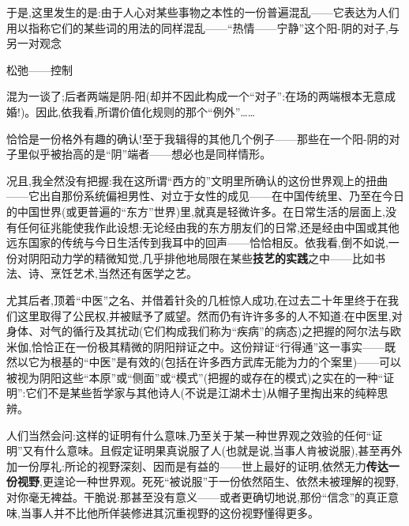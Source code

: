 于是,这里发生的是:由于人心对某些事物之本性的一份普遍混乱——它表达为人们用以指称它们的某些词的用法的同样混乱——“热情——宁静”这个阳-阴的对子,与另一对观念

\begin{center}松弛——控制\end{center}

混为一谈了;后者两端是阴-阳(却并不因此构成一个“对子”:在场的两端根本无意成婚!)。因此,依我看,所谓价值化规则的那个“例外”……

恰恰是一份格外有趣的确认!至于我辑得的其他几个例子——那些在一个阳-阴的对子里似乎被抬高的是“阴”端者——想必也是同样情形。

况且,我全然没有把握:我在这所谓“西方的”文明里所确认的这份世界观上的扭曲——它出自那份系统偏袒男性、对立于女性的成见——在中国传统里、乃至在今日的中国世界(或更普遍的“东方”世界)里,就真是轻微许多\dmark{}。在日常生活的层面上,没有任何征兆能使我作此设想:无论经由我的东方朋友们的日常,还是经由中国或其他远东国家的传统与今日生活传到我耳中的回声——恰恰相反。依我看,倒不如说,一份对阴阳动力学的精微知觉,几乎排他地局限在某些\textbf{技艺的实践}之中——比如书法、诗、烹饪艺术,当然还有医学之艺。

尤其后者,顶着“中医”之名、并借着针灸的几桩惊人成功,在过去二十年里终于在我们这里取得了公民权,并被赋予了威望。然而仍有许许多多的人不知道:在中医里,对身体、对气的循行及其扰动(它们构成我们称为“疾病”的病态)之把握的阿尔法与欧米伽,恰恰正在一份极其精微的阴阳辩证之中。这份辩证“行得通”这一事实——既然以它为根基的“中医”是有效的(包括在许多西方武库无能为力的个案里)——可以被视为阴阳这些“本原”或“侧面”或“模式”(把握的或存在的模式)之实在的一种“证明”:它们不是某些哲学家与其他诗人(不说是江湖术士)从帽子里掏出来的纯粹思辨。

人们当然会问:这样的证明有什么意味,乃至关于某一种世界观之效验的任何“证明”又有什么意味。且假定证明果真说服了人(也就是说,当事人肯被说服),甚至再外加一份厚礼:所论的视野深刻、因而是有益的——世上最好的证明,依然无力\textbf{传达\dmark{}一份视野},更遑论一种世界观。死死“被说服”于一份依然陌生、依然未被理解的视野,对你毫无裨益。干脆说:那甚至没有意义——或者更确切地说,那份“信念”的真正意味,当事人并不比他所佯装修进其沉重视野的这份视野懂得更多。

